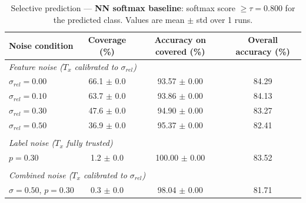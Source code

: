 \begin{table}[ht]
\centering
\caption{Selective prediction — \textbf{NN softmax baseline}: softmax score $\geq \tau = 0.800$ for the predicted class. Values are mean $\pm$ std over 1 runs.}
\label{tab:thresh-nn-0-8}
\begin{tabular}{lccc}
\toprule
Noise condition & Coverage (\%) & Accuracy on covered (\%) & Overall accuracy (\%) \\
\midrule
\multicolumn{4}{l}{\textit{Feature noise ($T_x$ calibrated to $\sigma_{rel}$)}} \\
$\sigma_{rel}=0.00$ & 66.1 $\pm$ 0.0 & 93.57 $\pm$ 0.00 & 84.29 \\
$\sigma_{rel}=0.10$ & 63.7 $\pm$ 0.0 & 93.86 $\pm$ 0.00 & 84.13 \\
$\sigma_{rel}=0.30$ & 47.6 $\pm$ 0.0 & 94.90 $\pm$ 0.00 & 83.27 \\
$\sigma_{rel}=0.50$ & 36.9 $\pm$ 0.0 & 95.37 $\pm$ 0.00 & 82.41 \\
\midrule \\
\multicolumn{4}{l}{\textit{Label noise ($T_x$ fully trusted)}} \\
$p=0.30$ & 1.2 $\pm$ 0.0 & 100.00 $\pm$ 0.00 & 83.52 \\
\midrule \\
\multicolumn{4}{l}{\textit{Combined noise ($T_x$ calibrated to $\sigma_{rel}$)}} \\
$\sigma=0.50,\,p=0.30$ & 0.3 $\pm$ 0.0 & 98.04 $\pm$ 0.00 & 81.71 \\
\bottomrule
\end{tabular}
\end{table}